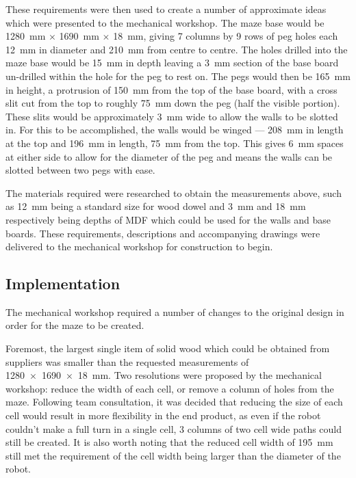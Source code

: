 These requirements were then used to create a number of approximate ideas which
were presented to the mechanical workshop. The maze base would be \SI{1280}{\mm}
$\times$ \SI{1690}{\mm} $\times$ \SI{18}{\mm}, giving 7 columns by 9 rows of
peg holes each \SI{12}{\mm} in diameter and \SI{210}{\mm} from centre to
centre. The holes drilled into the maze base would be \SI{15}{\mm} in depth
leaving a \SI{3}{\mm} section of the base board un-drilled within the hole for the peg to rest on. The pegs would then be
\SI{165}{\mm} in height, a protrusion of \SI{150}{\mm} from the top of the base board, with a cross slit cut from the top to
roughly \SI{75}{\mm} down the peg
(half the visible portion). These slits would be approximately \SI{3}{\mm} wide to allow the walls to be slotted in. For
this to be accomplished, the walls would be winged --- \SI{208}{\mm} in length at the top and \SI{196}{\mm} in length,
\SI{75}{\mm} from the top. This gives \SI{6}{\mm} spaces at either side to allow for the diameter of the peg and means the walls
can be slotted between two pegs with ease.

The materials required were researched to obtain the measurements
above, such as \SI{12}{\mm} being a standard size for wood dowel and \SI{3}{\mm}
and \SI{18}{\mm} respectively being depths of MDF which could be used for the
walls and base boards. These requirements, descriptions and accompanying
drawings were delivered to the mechanical workshop for construction to begin.

\subsection{Implementation}\label{test/maze/impl}
The mechanical workshop required a number of changes to the original design in
order for the maze to be created.

Foremost, the largest single item of solid wood which could be obtained from
suppliers was smaller than the requested measurements of \SI{1280 x 1690 x 18}
{\mm}. Two resolutions were proposed by the mechanical workshop: reduce
the width of each cell, or remove a column of holes from the maze. Following
team consultation, it was decided that reducing the size of each cell would
result in more flexibility in the end product, as even if the robot couldn't
make a full turn in a single cell, 3 columns of two cell wide paths could still
be created. It is also worth noting that the reduced cell width of \SI{195}{\mm}
still met the requirement of the cell width being larger than the diameter of
the robot.

